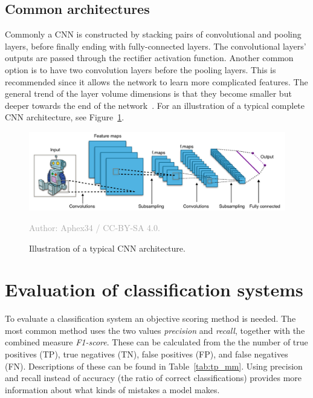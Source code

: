 \documentclass{kththesis}
\newcommand{\source}[1]{\vspace{-5mm}\caption*{\textcolor{darkgray}{Author: {#1}}\vspace{-7mm}} }
\begin{document}
\subsection{Common architectures}
Commonly a CNN is constructed by stacking pairs of convolutional and pooling layers, before finally ending with fully-connected layers. The convolutional layers' outputs are passed through the rectifier activation function. Another common option is to have two convolution layers before the pooling layers. This is recommended since it allows the network to learn more complicated features. The general trend of the layer volume dimensions is that they become smaller but deeper towards the end of the network~\cite{cnnIntro}. For an illustration of a typical complete CNN architecture, see Figure~\ref{fig:typical_cnn}.

\begin{figure}
  \begin{center}
    \includegraphics[width=150mm]{img/typical_cnn.png}
    \caption{Illustration of a typical CNN architecture.}
    \source{Aphex34 / CC-BY-SA 4.0.}
    \label{fig:typical_cnn}
  \end{center}
\end{figure}

\section{Evaluation of classification systems}
To evaluate a classification system an objective scoring method is needed. The most common method uses the two values \textit{precision} and \textit{recall}, together with the combined measure \textit{F1-score}. These can be calculated from the the number of true positives (TP), true negatives (TN), false positives (FP), and false negatives (FN). Descriptions of these can be found in Table~\ref{tab:tp_mm}. Using precision and recall instead of accuracy (the ratio of correct classifications) provides more information about what kinds of mistakes a model makes.
\end{document}
